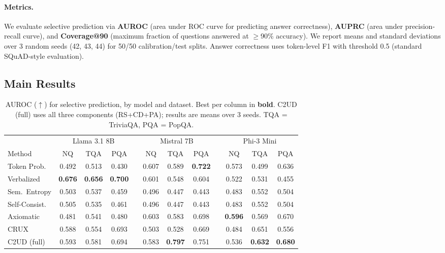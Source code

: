 \documentclass{article}
\newcommand{\ours}{\textsc{C2UD}}
\begin{document}
\paragraph{Metrics.}
We evaluate selective prediction via \textbf{AUROC} (area under ROC curve for predicting answer correctness), \textbf{AUPRC} (area under precision-recall curve), and \textbf{Coverage@90} (maximum fraction of questions answered at $\geq$90\% accuracy).
We report means and standard deviations over 3 random seeds (42, 43, 44) for 50/50 calibration/test splits.
Answer correctness uses token-level F1 with threshold 0.5 (standard SQuAD-style evaluation).

\subsection{Main Results}

\begin{table}[t]
\caption{AUROC ($\uparrow$) for selective prediction, by model and dataset. Best per column in \textbf{bold}. \ours{} (full) uses all three components (RS+CD+PA); results are means over 3 seeds. TQA = TriviaQA, PQA = PopQA.}
\label{tab:main_per_model}
\centering
\begin{adjustbox}{max width=\textwidth}
\begin{tabular}{l ccc c ccc c ccc}
\toprule
& \multicolumn{3}{c}{Llama 3.1 8B} && \multicolumn{3}{c}{Mistral 7B} && \multicolumn{3}{c}{Phi-3 Mini} \\
\cmidrule{2-4} \cmidrule{6-8} \cmidrule{10-12}
Method & NQ & TQA & PQA && NQ & TQA & PQA && NQ & TQA & PQA \\
\midrule
Token Prob. & 0.492 & 0.513 & 0.430 && 0.607 & 0.589 & \textbf{0.722} && 0.573 & 0.499 & 0.636 \\
Verbalized & \textbf{0.676} & \textbf{0.656} & \textbf{0.700} && 0.601 & 0.548 & 0.604 && 0.522 & 0.531 & 0.455 \\
Sem.\ Entropy & 0.503 & 0.537 & 0.459 && 0.496 & 0.447 & 0.443 && 0.483 & 0.552 & 0.504 \\
Self-Consist. & 0.505 & 0.535 & 0.461 && 0.496 & 0.447 & 0.443 && 0.483 & 0.552 & 0.504 \\
Axiomatic & 0.481 & 0.541 & 0.480 && 0.603 & 0.583 & 0.698 && \textbf{0.596} & 0.569 & 0.670 \\
CRUX & 0.588 & 0.554 & 0.693 && 0.503 & 0.528 & 0.669 && 0.484 & 0.651 & 0.556 \\
\midrule
\ours{} (full) & 0.593 & 0.581 & 0.694 && 0.583 & \textbf{0.797} & 0.751 && 0.536 & \textbf{0.632} & \textbf{0.680} \\
\bottomrule
\end{tabular}
\end{adjustbox}
\end{table}
\end{document}

